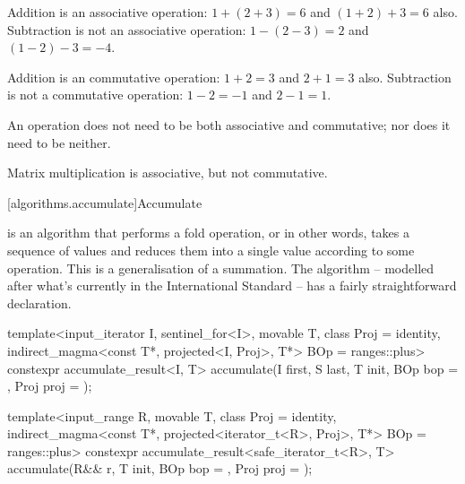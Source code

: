 \pnum
\begin{example}
   Addition is an associative operation: $1 + (2 + 3) = 6$ and $(1 + 2) + 3 = 6$ also. Subtraction
   is not an associative operation: $1 - (2 - 3) = 2$ and $(1 - 2) - 3 = -4$.
\end{example}

\pnum
\begin{example}
   Addition is an commutative operation: $1 + 2 = 3$ and $2 + 1 = 3$ also. Subtraction is not a
   commutative operation: $1 - 2 = -1$ and $2 - 1 = 1$.
\end{example}

\pnum
\begin{note}
   An operation does not need to be both associative and commutative; nor does it need to be
   neither.
   \begin{example}
      Matrix multiplication is associative, but not commutative\cite{wolfram-matrix-multiplication}.
   \end{example}
\end{note}

[algorithms.accumulate]{Accumulate}

 is an algorithm that performs a fold operation, or in other words, takes a
sequence of values and reduces them into a single value according to some operation. This is a
generalisation of a summation.  The algorithm -- modelled after what's currently in the
International Standard -- has a fairly straightforward declaration.

\begin{itemdecl}
template<input_iterator I, sentinel_for<I>, movable T, class Proj = identity,
         indirect_magma<const T*, projected<I, Proj>, T*> BOp = ranges::plus>
constexpr accumulate_result<I, T>
  accumulate(I first, S last, T init, BOp bop = {}, Proj proj = {});

template<input_range R, movable T, class Proj = identity,
         indirect_magma<const T*, projected<iterator_t<R>, Proj>, T*> BOp = ranges::plus>
constexpr accumulate_result<safe_iterator_t<R>, T>
  accumulate(R&& r, T init, BOp bop = {}, Proj proj = {});
\end{itemdecl}

